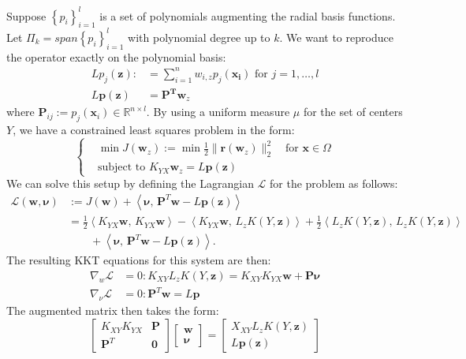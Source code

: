 \documentclass[11pt]{article}
\begin{document}
Suppose $\left\{p_i\right\}_{i=1}^l$ is a set of polynomials augmenting the radial basis functions. Let $\Pi_k=span\left\{p_i\right\}_{i=1}^l$ with polynomial degree up to $k$. We want to reproduce the operator exactly on the polynomial basis: 
\begin{align*}
	Lp_j(\bm{z}) :&= \sum_{i=1}^n w_{i,z} p_j(\bm{x_i}) \text{ for } j = 1, \hdots, l\\
	L\bm{p}(\bm{z}) &= \bm{P^T} \bm{w}_z
\end{align*}
where $\bm{P}_{ij} := p_j(\bm{x}_i) \in \mathbb{R}^{n \times l}$. By using a uniform measure $\mu$ for the set of centers $Y$, we have a constrained least squares problem in the form:
\begin{equation}
	\left\{
	\begin{aligned}
		&\min J(\bm{w}_z) := \min \frac{1}{2}\|\bm{r}(\bm{w}_z)\|_2^2 \quad \text{for } \bm{x} \in \Omega \\
		&\text{subject to } K_{YX} \bm{w}_z = L\bm{p}(\bm{z})
	\end{aligned}
	\right.
\end{equation}
We can solve this setup by defining the Lagrangian $\mathcal{L}$ for the problem as follows:
\begin{align*}
\mathcal{L}(\bm{w},\bm{\nu})
&:= J(\bm{w})
+ \left\langle \bm{\nu},\,\bm{P}^{T}\bm{w} - L\bm{p}(\bm{z}) \right\rangle \\
&= \frac{1}{2}
\left\langle K_{YX}\bm{w},\,K_{YX}\bm{w} \right\rangle
- \left\langle K_{YX}\bm{w},\,L_z K(Y, \bm{z}) \right\rangle
+ \frac{1}{2}
\left\langle L_z K(Y,\bm{z}),\,L_z K(Y,\bm{z}) \right\rangle \\
&\qquad
+ \left\langle \bm{\nu},\,\bm{P}^{T}\bm{w} - L\bm{p}(\bm{z}) \right\rangle.
\end{align*}
The resulting KKT equations for this system are then:
\begin{align*}
	\nabla_w \mathcal{L} &= 0: K_{XY} L_z K(Y,\bm{z}) = K_{XY} K_{YX} \bm{w} + \bm{P} \bm{\nu} \label{eq:normal_eq}\\
	\nabla_\nu \mathcal{L} &= 0: \bm{P}^T \bm{w} = L\bm{p}
\end{align*}
The augmented matrix then takes the form:
\begin{equation}
	\begin{bmatrix}
		K_{XY} K_{YX} & \bm{P} \\
		\bm{P}^T & \bm{0}
	\end{bmatrix}
	\begin{bmatrix}
		\bm{w} \\ \bm{\nu}
	\end{bmatrix} =
	\begin{bmatrix}
		X_{XY} L_z K(Y,\bm{z}) \\ L\bm{p}(\bm{z})
	\end{bmatrix}
	\label{eq:augmented}
\end{equation}
\end{document}
